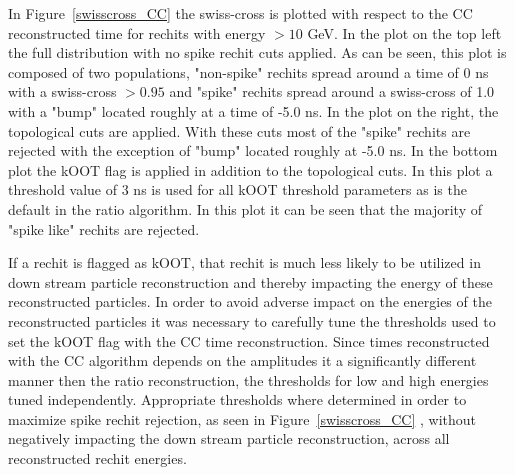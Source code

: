 In Figure~\ref{swisscross_CC} the swiss-cross is plotted with respect to the CC reconstructed time for rechits with energy $>10$ GeV. In the plot on the top left the full distribution with no spike rechit cuts applied. As can be seen, this plot is composed of two populations, "non-spike" rechits spread around a time of 0 ns with a swiss-cross $>0.95$ and "spike" rechits spread around a swiss-cross of 1.0 with a "bump" located roughly at a time of -5.0 ns. In the plot on the right, the topological cuts are applied. With these cuts most of the "spike" rechits are rejected with the exception of "bump" located roughly at -5.0 ns. In the bottom plot the kOOT flag is applied in addition to the topological cuts. In this plot a threshold value of 3 ns is used for all kOOT threshold parameters as is the default in the ratio algorithm. In this plot it can be seen that the majority of "spike like" rechits are rejected.

If a rechit is flagged as kOOT, that rechit is much less likely to be utilized in down stream particle reconstruction and thereby impacting the energy of these reconstructed particles.  In order to avoid adverse impact on the energies of the reconstructed particles it was necessary to carefully tune the thresholds used to set the kOOT flag with the CC time reconstruction. Since times reconstructed with the CC algorithm depends on the amplitudes it a significantly different manner then the ratio reconstruction, the thresholds for low and high energies tuned independently.  Appropriate thresholds where determined in order to maximize spike rechit rejection, as seen in Figure~\ref{swisscross_CC} , without negatively impacting the down stream particle reconstruction, across all reconstructed rechit energies.



